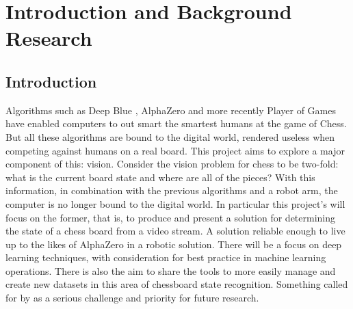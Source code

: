 \chapter{Introduction and Background Research}

\label{chapter1}

\section{Introduction}

Algorithms such as Deep Blue \cite{parikh1980adaptive}, AlphaZero \cite{} and more recently Player of Games\cite{}
have enabled computers to out smart the smartest humans at the game of Chess.
But all these algorithms are bound to the digital world, rendered useless when
competing against humans on a real board. This project aims to explore a major
component of this: vision.
Consider the vision problem for chess to be two-fold: what is the current board
state and where are all of the pieces?  With this information, in combination with the
previous algorithms and a robot arm, the computer is no longer bound to the
digital world.
In particular this project's will focus on the former, that is, to produce and present a solution for determining the
state of a chess board from a video stream.  A solution reliable enough to live up to the likes of AlphaZero 
in a robotic solution.  There will be a focus on deep learning techniques, with
consideration for best practice in machine learning operations.  There is also the aim to share the 
tools to more easily manage and create new datasets in this area of chessboard state recognition.  Something 
called for by \cite{} as a serious challenge and priority for future research.

